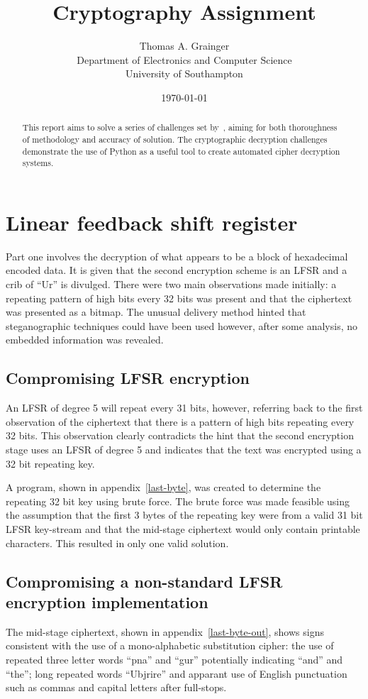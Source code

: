 \documentclass[pdftex, 11pt, a4paper]{article}
\title{Cryptography Assignment}
\author{
    Thomas A. Grainger \\
    Department of Electronics and Computer Science\\
    University of Southampton\\
}
\date{\today}
\begin{document}
\maketitle

\begin{abstract}
This report aims to solve a series of challenges set by~\textcite{instructions},
aiming for both thoroughness of methodology and accuracy of solution. The
cryptographic decryption challenges demonstrate the use of Python as a useful
tool to create automated cipher decryption systems.
\end{abstract}

\tableofcontents
\pagebreak
\section{Linear feedback shift register}
Part one involves the decryption of what appears to be a block of hexadecimal encoded data.  It is given that the second encryption scheme is an LFSR and a crib of ``Ur'' is divulged.  There were two main observations made initially: a repeating pattern of high bits every 32 bits was present and that the ciphertext was presented as a bitmap.  The unusual delivery method hinted that steganographic techniques could have been used however, after some analysis, no embedded information was revealed.

\subsection{Compromising LFSR encryption}
An LFSR of degree 5 will repeat every 31 bits, however, referring back to the first observation of the ciphertext that there is a pattern of high bits repeating every 32 bits. This observation clearly contradicts the hint that the second encryption stage uses an LFSR of degree 5 and indicates that the text was encrypted using a 32 bit repeating key.

A program, shown in appendix~\ref{last-byte}, was created to determine the repeating 32 bit key using brute force. The brute force was made feasible using the assumption that the first 3 bytes of the repeating key were from a valid 31 bit LFSR key-stream and that the mid-stage ciphertext would only contain printable characters. This resulted in only one valid solution.

\subsection{Compromising a non-standard LFSR encryption implementation}
The mid-stage ciphertext, shown in appendix~\ref{last-byte-out}, shows signs consistent with the use of a mono-alphabetic substitution cipher: the use of repeated three letter words ``pna'' and ``gur'' potentially indicating ``and'' and ``the''; long repeated words ``Ubjrire'' and apparant use of English punctuation such as commas and capital letters after full-stops.
\end{document}
